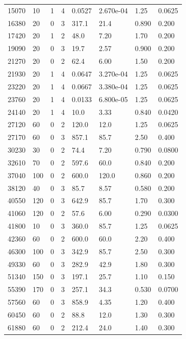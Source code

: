 \documentclass[preview]{standalone}
\begin{document}
{{\begin{tabular}{L{1.2cm}C{1.2cm} C{0.3cm}C{0.5cm} C{1.4cm}C{1.4cm} C{1.4cm}C{1.4cm}}
  15070  &    10  & 1     &  4 &  0.0527  & 2.670e-04  & 1.25 &  0.0625   \\ 
  16380  &    20  & 0     &  3 &  317.1  & 21.4  & 0.890 &  0.200   \\ 
  17420  &    20  & 1     &  2 &  48.0  & 7.20  & 1.70 &  0.200   \\ 
  19090  &    20  & 0     &  3 &  19.7  & 2.57  & 0.900 &  0.200   \\ 
  21270  &    20  & 0     &  2 &  62.4  & 6.00  & 1.50 &  0.200   \\ 
  21930  &    20  & 1     &  4 &  0.0647  & 3.270e-04  & 1.25 &  0.0625   \\ 
  23220  &    20  & 1     &  4 &  0.0667  & 3.380e-04  & 1.25 &  0.0625   \\ 
  23760  &    20  & 1     &  4 &  0.0133  & 6.800e-05  & 1.25 &  0.0625   \\ 
  24140  &    20  & 1     &  4 &  10.0  & 3.33  & 0.840 &  0.0420   \\ 
  27120  &    60  & 0     &  2 &  120.0  & 12.0  & 1.25 &  0.0625   \\ 
  27170  &    60  & 0     &  3 &  857.1  & 85.7  & 2.50 &  0.400   \\ 
  30230  &    30  & 0     &  2 &  74.4  & 7.20  & 0.790 &  0.0800   \\ 
  32610  &    70  & 0     &  2 &  597.6  & 60.0  & 0.840 &  0.200   \\ 
  37040  &   100  & 0     &  2 &  600.0  & 120.0  & 0.860 &  0.200   \\ 
  38120  &    40  & 0     &  3 &  85.7  & 8.57  & 0.580 &  0.200   \\ 
  40550  &   120  & 0     &  3 &  642.9  & 85.7  & 1.70 &  0.300   \\ 
  41060  &   120  & 0     &  2 &  57.6  & 6.00  & 0.290 &  0.0300   \\ 
  41800  &    10  & 0     &  3 &  360.0  & 85.7  & 1.25 &  0.0625   \\ 
  42360  &    60  & 0     &  2 &  600.0  & 60.0  & 2.20 &  0.400   \\ 
  46300  &   100  & 0     &  3 &  342.9  & 85.7  & 2.50 &  0.300   \\ 
  49330  &    60  & 0     &  3 &  282.9  & 42.9  & 1.80 &  0.300   \\ 
  51340  &   150  & 0     &  3 &  197.1  & 25.7  & 1.10 &  0.150   \\ 
  55390  &   170  & 0     &  3 &  257.1  & 34.3  & 0.530 &  0.0700   \\ 
  57560  &    60  & 0     &  3 &  858.9  & 4.35  & 1.20 &  0.400   \\ 
  60450  &    60  & 0     &  2 &  88.8  & 12.0  & 1.30 &  0.300   \\ 
  61880  &    60  & 0     &  2 &  212.4  & 24.0  & 1.40 &  0.300   \\ 
\hline 
\end{tabular} 

}}
\end{document}
